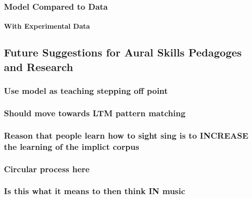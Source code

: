 \documentclass[]{book}
\let\oldparagraph\paragraph
\renewcommand{\paragraph}[1]{\oldparagraph{#1}\mbox{}}
\theoremstyle{definition}
\theoremstyle{definition}
\theoremstyle{definition}
\theoremstyle{remark}
\begin{document}
\hypertarget{model-compared-to-data}{%
\subsubsection{Model Compared to Data}\label{model-compared-to-data}}

\hypertarget{with-experimental-data}{%
\paragraph{With Experimental Data}\label{with-experimental-data}}

\hypertarget{future-suggestions-for-aural-skills-pedagoges-and-research}{%
\subsection{Future Suggestions for Aural Skills Pedagoges and
Research}\label{future-suggestions-for-aural-skills-pedagoges-and-research}}

\hypertarget{use-model-as-teaching-stepping-off-point}{%
\subsubsection{Use model as teaching stepping off
point}\label{use-model-as-teaching-stepping-off-point}}

\hypertarget{should-move-towards-ltm-pattern-matching}{%
\subsubsection{Should move towards LTM pattern
matching}\label{should-move-towards-ltm-pattern-matching}}

\hypertarget{reason-that-people-learn-how-to-sight-sing-is-to-increase-the-learning-of-the-implict-corpus}{%
\subsubsection{Reason that people learn how to sight sing is to INCREASE
the learning of the implict
corpus}\label{reason-that-people-learn-how-to-sight-sing-is-to-increase-the-learning-of-the-implict-corpus}}

\hypertarget{circular-process-here}{%
\subsubsection{Circular process here}\label{circular-process-here}}

\hypertarget{is-this-what-it-means-to-then-think-in-music}{%
\subsubsection{Is this what it means to then think IN
music}\label{is-this-what-it-means-to-then-think-in-music}}
\end{document}
